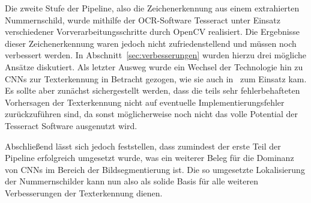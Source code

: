Die zweite Stufe der Pipeline, also die Zeichenerkennung aus einem
extrahierten Nummernschild, wurde mithilfe der OCR-Software Tesseract
unter Einsatz verschiedener Vorverarbeitungsschritte durch OpenCV realisiert.
Die Ergebnisse dieser Zeichenerkennung waren jedoch nicht
zufriedenstellend und m\"ussen noch verbessert werden.
In Abschnitt~\ref{sec:verbesserungen} wurden hierzu drei m\"ogliche
Ans\"atze diskutiert. Als letzter Ausweg wurde ein Wechsel der
Technologie hin zu CNNs zur Texterkennung in Betracht gezogen, wie sie
auch in~\cite{silva2018a} zum Einsatz kam. Es sollte
aber zun\"achst sichergestellt werden, dass die teils sehr
fehlerbehafteten Vorhersagen der Texterkennung nicht auf eventuelle
Implementierungsfehler zur\"uckzuf\"uhren sind, da sonst
m\"oglicherweise noch nicht das volle Potential der Tesseract Software
ausgenutzt wird.

Abschlie{\ss}end l\"asst sich jedoch feststellen, dass zumindest der erste Teil der
Pipeline erfolgreich umgesetzt wurde, was ein weiterer Beleg f\"ur die
Dominanz von CNNs im Bereich der Bildsegmentierung ist.
Die so umgesetzte Lokalisierung der Nummernschilder kann nun also
als solide Basis f\"ur alle weiteren Verbesserungen der
Texterkennung dienen.
